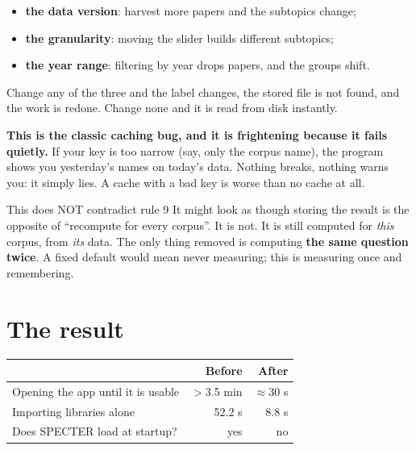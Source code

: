 \documentclass[11pt,a4paper]{article}
\begin{document}
\begin{itemize}
  \item \textbf{the data version}: harvest more papers and the subtopics change;
  \item \textbf{the granularity}: moving the slider builds different subtopics;
  \item \textbf{the year range}: filtering by year drops papers, and the groups shift.
\end{itemize}

Change any of the three and the label changes, the stored file is not found, and the work
is redone. Change none and it is read from disk instantly.

\begin{ojo}
\textbf{This is the classic caching bug, and it is frightening because it fails quietly.}
If your key is too narrow (say, only the corpus name), the program shows you yesterday's
names on today's data. Nothing breaks, nothing warns you: it simply lies. A cache with a
bad key is worse than no cache at all.
\end{ojo}

\begin{concepto}{This does NOT contradict rule 9}
It might look as though storing the result is the opposite of ``recompute for every
corpus''. It is not. It is still computed for \emph{this} corpus, from \emph{its} data.
The only thing removed is computing \textbf{the same question twice}. A fixed default
would mean never measuring; this is measuring once and remembering.
\end{concepto}

\section{The result}

\begin{center}
\begin{tabular}{lrr}
\hline
 & \textbf{Before} & \textbf{After} \\
\hline
Opening the app until it is usable & $>$3.5 min & $\approx$30 s \\
Importing libraries alone          & 52.2 s     & 8.8 s \\
Does SPECTER load at startup?      & yes        & no \\
\hline
\end{tabular}
\end{center}
\end{document}
